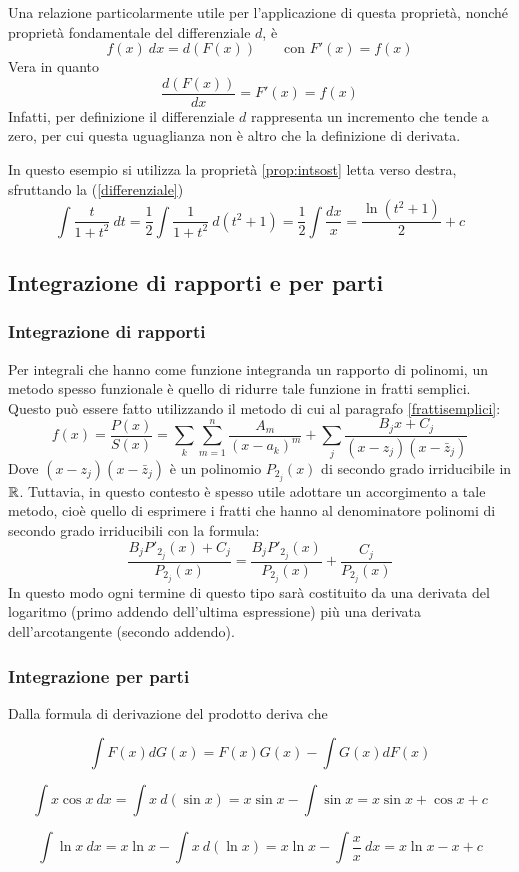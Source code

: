 Una relazione particolarmente utile per l'applicazione di questa proprietà, nonché proprietà fondamentale del differenziale $d$, è
\begin{equation}
	\label{differenziale}
	f(x)~dx=d(F(x))\qquad\text{con }F'(x)=f(x)
\end{equation}
Vera in quanto
\[
	\frac{d(F(x))}{dx}=F'(x)=f(x)
\]
Infatti, per definizione il differenziale $d$ rappresenta un incremento che tende a zero, per cui questa uguaglianza non è altro che la definizione di derivata.

\begin{examp}
	In questo esempio si utilizza la proprietà \ref{prop:intsost} letta verso destra, sfruttando la (\ref{differenziale})
	\[
		\int \frac{t}{1+t^2}~dt=\frac{1}{2}\int\frac{1}{1+t^2}~d(t^2+1)=\frac{1}{2}\int\frac{dx}{x}=\frac{\ln(t^2+1)}{2}+c
	\]
\end{examp}


\subsection{Integrazione di rapporti e per parti}

\subsubsection{Integrazione di rapporti}
Per integrali che hanno come funzione integranda un rapporto di polinomi, un metodo spesso funzionale è quello di ridurre tale funzione in fratti semplici. Questo può essere fatto utilizzando il metodo di cui al paragrafo \vref{frattisemplici}:
\[
	f(x)=\frac{P(x)}{S(x)}=\sum_k\sum_{m=1}^n \frac{A_m}{(x-a_k)^m}+\sum_j \frac{B_jx+C_j}{(x-z_j)(x-\bar z_j)}
\]
Dove $(x-z_j)(x-\bar z_j)$ è un polinomio $P_{2_j}(x)$ di secondo grado irriducibile in $\mathbb{R}$. Tuttavia, in questo contesto è spesso utile adottare un accorgimento a tale metodo, cioè quello di esprimere i fratti che hanno al denominatore polinomi di secondo grado irriducibili con la formula:
\[
	\frac{B_jP'_{2_j}(x)+C_j}{P_{2_j}(x)}=\frac{B_jP'_{2_j}(x)}{P_{2_j}(x)}+\frac{C_j}{P_{2_j}(x)}
\]
In questo modo ogni termine di questo tipo sarà costituito da una derivata del logaritmo (primo addendo dell'ultima espressione) più una derivata dell'arcotangente (secondo addendo).

\subsubsection{Integrazione per parti}
Dalla formula di derivazione del prodotto deriva che
\begin{prop}
	\[
		\int F(x)dG(x)=F(x)G(x)-\int G(x)dF(x)
	\]
\end{prop}

\begin{examp}
	\[
		\int x\cos x~dx=\int x~d(\sin x)=x\sin x-\int\sin x=x\sin x+\cos x +c
	\]
\end{examp}
\begin{examp}
	\[
		\int\ln x~dx=x\ln x-\int x~d(\ln x)=x\ln x-\int \frac{x}{x}~dx=x\ln x-x+c
	\]
\end{examp}
